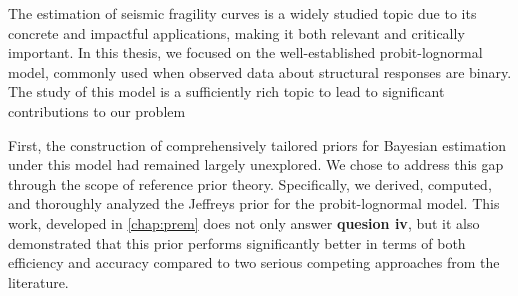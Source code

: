 




The estimation of seismic fragility curves is a widely studied topic due to its concrete and impactful applications, making it both relevant and critically important. In this thesis, we focused on the well-established probit-lognormal model, commonly used when observed data about structural responses are binary. The study of this model %
is a sufficiently rich topic to lead to significant contributions to our problem


First, the construction of comprehensively tailored priors for Bayesian estimation under this model had remained largely unexplored. We chose to address this gap through the scope of reference prior theory. Specifically, we derived, computed, and thoroughly analyzed the Jeffreys prior for the probit-lognormal model. This work, developed in \cref{chap:prem} does not only answer \textbf{quesion iv}, but it also demonstrated that this prior performs significantly better in terms of both efficiency and accuracy compared to two serious competing approaches from the literature.

